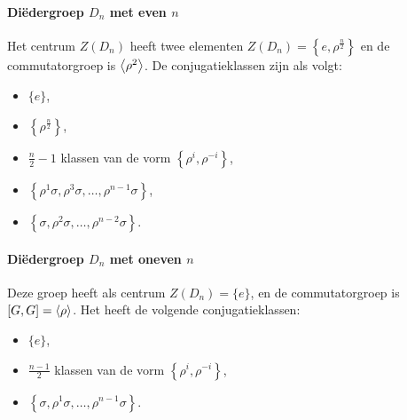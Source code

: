 \paragraph{Diëdergroep \(D_{n}\) met even \(n\)} Het centrum \(Z(D_{n})\) heeft twee elementen \(Z(D_{n})=\left\{e,\rho^{\frac{n}{2}}\right\}\) en de commutatorgroep is \(\left\langle\rho^{2}\right\rangle\). De conjugatieklassen zijn als volgt:
\begin{itemize}
    \item \(\{e\}\),
    \item \(\left\{\rho^{\frac{n}{2}}\right\}\),
    \item \(\frac{n}{2}-1\) klassen van de vorm \(\left\{\rho^{i},\rho^{-i}\right\}\),
    \item \(\left\{\rho^{1}\sigma,\rho^{3}\sigma,\dots,\rho^{n-1}\sigma\right\}\),
    \item \(\left\{\sigma,\rho^{2}\sigma,\dots,\rho^{n-2}\sigma\right\}\).
\end{itemize}

\paragraph{Diëdergroep \(D_{n}\) met oneven \(n\)} Deze groep heeft als centrum \(Z(D_{n})=\{e\}\), en de commutatorgroep is \([G,G]=\left\langle\rho\right\rangle\). Het heeft de volgende conjugatieklassen:
\begin{itemize}
    \item \(\{e\}\),
    \item \(\frac{n-1}{2}\) klassen van de vorm \(\left\{\rho^{i},\rho^{-i}\right\}\),
    \item \(\left\{\sigma,\rho^{1}\sigma,\dots,\rho^{n-1}\sigma\right\}\).
\end{itemize}

